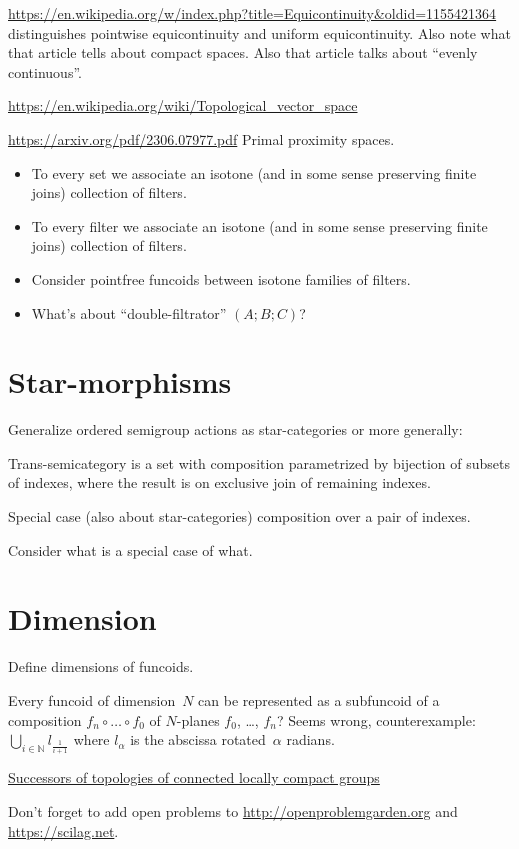 \documentclass{amsart}
\begin{document}
\url{https://en.wikipedia.org/w/index.php?title=Equicontinuity&oldid=1155421364} distinguishes
pointwise equicontinuity and uniform equicontinuity. Also note what that article tells about compact spaces.
Also that article talks about ``evenly continuous''.

\url{https://en.wikipedia.org/wiki/Topological_vector_space}

\url{https://arxiv.org/pdf/2306.07977.pdf} Primal proximity spaces.

\begin{itemize}
\item To every set we associate an isotone (and in some sense preserving finite joins) collection of filters.
\item To every filter we associate an isotone (and in some sense preserving finite joins) collection of filters.
\item Consider pointfree funcoids between isotone families of filters.
\item What's about ``double-filtrator'' $(A;B;C)$?
\end{itemize}

\section{Star-morphisms}

Generalize ordered semigroup actions as star-categories or more generally:

Trans-semicategory is a set with composition parametrized by bijection of subsets of indexes, where the result is on exclusive join of remaining indexes.

Special case (also about star-categories) composition over a pair of indexes.

Consider what is a special case of what.

\section{Dimension}

Define dimensions of funcoids.

Every funcoid of dimension~$N$ can be represented as
a subfuncoid of a composition $f_n\circ\dots\circ f_0$ of $N$-planes
$f_0$, \dots, $f_n$? Seems wrong, counterexample:
$\bigcup_{i\in\mathbb{N}} l_{\frac{1}{i+1}}$ where $l_\alpha$ is the
abscissa rotated~$\alpha$ radians.

\href{https://www.researchgate.net/publication/382445556_Successors_of_topologies_of_connected_locally_compact_groups}{Successors of topologies of connected locally compact groups}

Don't forget to add open problems to
\url{http://openproblemgarden.org} and
\url{https://scilag.net}.



\end{document}
